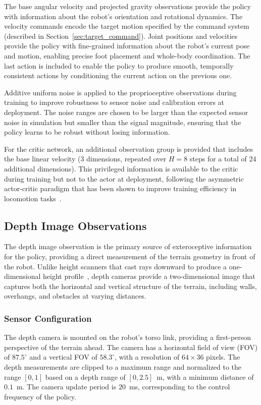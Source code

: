The base angular velocity and projected gravity observations provide the policy with information about the robot's orientation and rotational dynamics. The velocity commands encode the target motion specified by the command system (described in Section~\ref{sec:target_command}). Joint positions and velocities provide the policy with fine-grained information about the robot's current pose and motion, enabling precise foot placement and whole-body coordination. The last action is included to enable the policy to produce smooth, temporally consistent actions by conditioning the current action on the previous one.

Additive uniform noise is applied to the proprioceptive observations during training to improve robustness to sensor noise and calibration errors at deployment. The noise ranges are chosen to be larger than the expected sensor noise in simulation but smaller than the signal magnitude, ensuring that the policy learns to be robust without losing information.

For the critic network, an additional observation group is provided that includes the base linear velocity (3 dimensions, repeated over $H=8$ steps for a total of 24 additional dimensions). This privileged information is available to the critic during training but not to the actor at deployment, following the asymmetric actor-critic paradigm that has been shown to improve training efficiency in locomotion tasks~\cite{zhang2024rpl}.

\subsection{Depth Image Observations}
\label{sec:depth_obs}

The depth image observation is the primary source of exteroceptive information for the policy, providing a direct measurement of the terrain geometry in front of the robot. Unlike height scanners that cast rays downward to produce a one-dimensional height profile~\cite{zhang2024rpl,cheng2024extremeparkour}, depth cameras provide a two-dimensional image that captures both the horizontal and vertical structure of the terrain, including walls, overhangs, and obstacles at varying distances.

\subsubsection{Sensor Configuration}

The depth camera is mounted on the robot's torso link, providing a first-person perspective of the terrain ahead. The camera has a horizontal field of view (FOV) of $87.5^\circ$ and a vertical FOV of $58.3^\circ$, with a resolution of $64 \times 36$ pixels. The depth measurements are clipped to a maximum range and normalized to the range $[0, 1]$ based on a depth range of $[0, 2.5]$~m, with a minimum distance of $0.1$~m. The camera update period is $20$~ms, corresponding to the control frequency of the policy.

